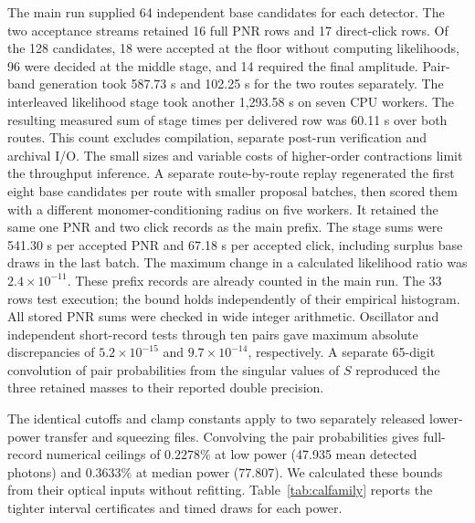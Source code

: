 \documentclass[11pt]{article}
\begin{document}
The main run supplied 64 independent base candidates for each detector. The two acceptance streams retained 16 full PNR rows and 17 direct-click rows. Of the 128 candidates, 18 were accepted at the floor without computing likelihoods, 96 were decided at the middle stage, and 14 required the final amplitude. Pair-band generation took 587.73 s and 102.25 s for the two routes separately. The interleaved likelihood stage took another 1,293.58 s on seven CPU workers. The resulting measured sum of stage times per delivered row was 60.11 s over both routes. This count excludes compilation, separate post-run verification and archival I/O. The small sizes and variable costs of higher-order contractions limit the throughput inference. A separate route-by-route replay regenerated the first eight base candidates per route with smaller proposal batches, then scored them with a different monomer-conditioning radius on five workers. It retained the same one PNR and two click records as the main prefix. The stage sums were 541.30 s per accepted PNR and 67.18 s per accepted click, including surplus base draws in the last batch. The maximum change in a calculated likelihood ratio was $2.4\times10^{-11}$. These prefix records are already counted in the main run. The 33 rows test execution; the bound holds independently of their empirical histogram. All stored PNR sums were checked in wide integer arithmetic. Oscillator and independent short-record tests through ten pairs gave maximum absolute discrepancies of $5.2\times10^{-15}$ and $9.7\times10^{-14}$, respectively. A separate 65-digit convolution of pair probabilities from the singular values of $S$ reproduced the three retained masses to their reported double precision.

The identical cutoffs and clamp constants apply to two separately released lower-power transfer and squeezing files. Convolving the pair probabilities gives full-record numerical ceilings of $0.2278\%$ at low power (47.935 mean detected photons) and $0.3633\%$ at median power (77.807). We calculated these bounds from their optical inputs without refitting. Table~\ref{tab:calfamily} reports the tighter interval certificates and timed draws for each power.
\end{document}
